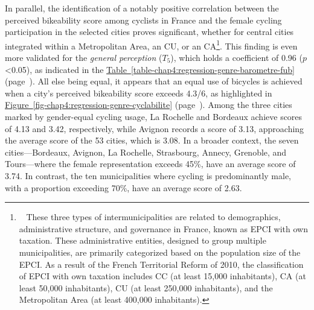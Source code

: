 \begin{refsegment}
In parallel, the identification of a notably positive correlation between the perceived bikeability score among cyclists in France and the female cycling participation in the selected cities proves significant, whether for central cities integrated within a Metropolitan Area, an \acrfull{CU}, or an \acrfull{CA}\footnote{~
    These three types of intermunicipalities are related to demographics, administrative structure, and governance in France, known as \acrfull{EPCI} with own taxation. These administrative entities, designed to group multiple municipalities, are primarily categorized based on the population size of the \acrshort{EPCI}. As a result of the French Territorial Reform of 2010, the classification of \acrshort{EPCI} with own taxation includes \acrfull{CC} (at least 15,000 inhabitants), \acrfull{CA} (at least 50,000 inhabitants), \acrfull{CU} (at least 250,000 inhabitants), and the Metropolitan Area (at least 400,000 inhabitants).
}. This finding is even more validated for the \textsl{general perception} (\(T_{5}\)), which holds a coefficient of 0.96 ($p$\textless0.05), as indicated in the \hyperref[table-chap4:regression-genre-barometre-fub]{Table~\ref{table-chap4:regression-genre-barometre-fub}} (page~\pageref{table-chap4:regression-genre-barometre-fub}). All else being equal, it appears that an equal use of bicycles is achieved when a city’s perceived bikeability score exceeds 4.3/6, as highlighted in \hyperref[fig-chap4:regression-genre-cyclabilite]{Figure~\ref{fig-chap4:regression-genre-cyclabilite}} (page~\pageref{fig-chap4:regression-genre-cyclabilite}). Among the three cities marked by gender-equal cycling usage, La Rochelle and Bordeaux achieve scores of 4.13 and 3.42, respectively, while Avignon records a score of 3.13, approaching the average score of the 53 cities, which is 3.08. In a broader context, the seven cities—Bordeaux, Avignon, La Rochelle, Strasbourg, Annecy, Grenoble, and Tours—where the female representation exceeds 45\%, have an average score of 3.74. In contrast, the ten municipalities where cycling is predominantly male, with a proportion exceeding 70\%, have an average score of 2.63.%


\end{refsegment}
